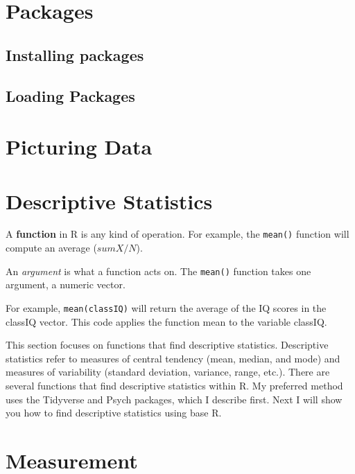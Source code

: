\documentclass[
]{book}
\begin{document}
\hypertarget{packages}{%
\chapter{Packages}\label{packages}}

\hypertarget{installing-packages}{%
\section{Installing packages}\label{installing-packages}}

\hypertarget{loading-packages}{%
\section{Loading Packages}\label{loading-packages}}

\hypertarget{picturing-data}{%
\chapter{Picturing Data}\label{picturing-data}}

\hypertarget{descriptive-statistics}{%
\chapter{Descriptive Statistics}\label{descriptive-statistics}}

A \textbf{function} in R is any kind of operation. For example, the \texttt{mean()} function will compute an average (\(sumX/N\)).

An \emph{argument} is what a function acts on. The \texttt{mean()} function takes one argument, a numeric vector.

For example, \texttt{mean(classIQ)} will return the average of the IQ scores in the classIQ vector. This code applies the function mean to the variable classIQ.

This section focuses on functions that find descriptive statistics. Descriptive statistics refer to measures of central tendency (mean, median, and mode) and measures of variability (standard deviation, variance, range, etc.). There are several functions that find descriptive statistics within R. My preferred method uses the Tidyverse and Psych packages, which I describe first. Next I will show you how to find descriptive statistics using base R.

\hypertarget{measurement}{%
\chapter{Measurement}\label{measurement}}
\end{document}
